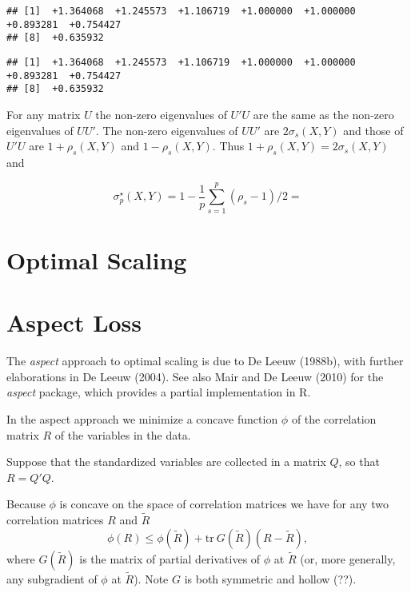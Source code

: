 \documentclass[
  12pt,
]{article}
\newenvironment{Shaded}{\begin{snugshade}}{\end{snugshade}}
\newcommand{\DecValTok}[1]{\textcolor[rgb]{0.00,0.00,0.81}{#1}}
\newcommand{\FunctionTok}[1]{\textcolor[rgb]{0.00,0.00,0.00}{#1}}
\newcommand{\NormalTok}[1]{#1}
\newcommand{\SpecialCharTok}[1]{\textcolor[rgb]{0.00,0.00,0.00}{#1}}
\begin{document}
\begin{verbatim}
## [1]  +1.364068  +1.245573  +1.106719  +1.000000  +1.000000  +0.893281  +0.754427
## [8]  +0.635932
\end{verbatim}

\begin{Shaded}
\end{Shaded}

\begin{verbatim}
## [1]  +1.364068  +1.245573  +1.106719  +1.000000  +1.000000  +0.893281  +0.754427
## [8]  +0.635932
\end{verbatim}

For any matrix \(U\) the non-zero eigenvalues of \(U'U\) are the same as the non-zero eigenvalues of \(UU'\). The non-zero eigenvalues of \(UU'\) are \(2\sigma_s(X,Y)\) and those of \(U'U\) are \(1+\rho_s(X,Y)\) and \(1-\rho_s(X,Y)\). Thus \(1+\rho_s(X,Y)=2\sigma_s(X,Y)\)
and

\[
\sigma_p^\star(X,Y)=1-\frac{1}{p}\sum_{s=1}^p(\rho_s-1)/2=
\]

\hypertarget{optimal-scaling}{%
\section{Optimal Scaling}\label{optimal-scaling}}

\hypertarget{aspect-loss}{%
\section{Aspect Loss}\label{aspect-loss}}

The \emph{aspect} approach to optimal scaling is due
to De Leeuw (1988b), with further elaborations in De Leeuw (2004). See also
Mair and De Leeuw (2010) for the \emph{aspect} package, which provides a partial implementation in R.

In the aspect approach we minimize a concave function \(\phi\) of the correlation matrix \(R\) of the variables in the data.

Suppose that the standardized variables
are collected in a matrix \(Q\), so that \(R=Q'Q\).

Because \(\phi\) is concave on the space of correlation matrices we have for any two
correlation matrices \(R\) and \(\tilde R\)
\[
\phi(R)\leq\phi(\tilde R)+\text{tr}\ G(\tilde R)(R-\tilde R),
\]
where \(G(\tilde R)\) is the matrix
of partial derivatives of \(\phi\) at \(\tilde R\)
(or, more generally, any subgradient of \(\phi\)
at \(\tilde R\)). Note \(G\) is both symmetric and hollow (??).
\end{document}
